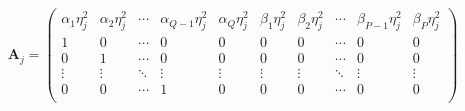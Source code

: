 \documentclass[10pt,a4paper,oneside]{article}
\providecommand{\DIFaddbegin}{} %
\providecommand{\DIFdelbegin}{} %
\providecommand{\DIFdelend}{} %
\newcommand{\DIFscaledelfig}{0.5}
\newlength{\DIFdelgraphicswidth} %
\newlength{\DIFdelgraphicsheight} %
\newcommand{\DIFaddincludegraphics}[2][]{{\color{blue}\fbox{\DIFOincludegraphics[#1]{#2}}}} %
\newcommand{\DIFdelincludegraphics}[2][]{%
\sbox{\DIFdelgraphicsbox}{\DIFOincludegraphics[#1]{#2}}%
\settoboxwidth{\DIFdelgraphicswidth}{\DIFdelgraphicsbox} %
\settoboxtotalheight{\DIFdelgraphicsheight}{\DIFdelgraphicsbox} %
\scalebox{\DIFscaledelfig}{%
\parbox[b]{\DIFdelgraphicswidth}{\usebox{\DIFdelgraphicsbox}\\[-\baselineskip] \rule{\DIFdelgraphicswidth}{0em}}\llap{\resizebox{\DIFdelgraphicswidth}{\DIFdelgraphicsheight}{%
\setlength{\unitlength}{\DIFdelgraphicswidth}%
\begin{picture}(1,1)%
\thicklines\linethickness{2pt} %
{\color[rgb]{1,0,0}\put(0,0){\framebox(1,1){}}}%
{\color[rgb]{1,0,0}\put(0,0){\line( 1,1){1}}}%
{\color[rgb]{1,0,0}\put(0,1){\line(1,-1){1}}}%
\end{picture}%
}\hspace*{3pt}}} %
} %
\DeclareRobustCommand{\DIFaddbegin}{\DIFOaddbegin \let\includegraphics\DIFaddincludegraphics} %
\DeclareRobustCommand{\DIFdelbegin}{\DIFOdelbegin \let\includegraphics\DIFdelincludegraphics} %
\DeclareRobustCommand{\DIFdelend}{\DIFOaddend \let\includegraphics\DIFOincludegraphics} %
\begin{document}
\[
    \mathbf{A}_j =
    \DIFdelbegin %
\DIFdelend \DIFaddbegin \begin{pmatrix}
        \alpha_1 \eta_j^2 & \alpha_2 \eta_j^2 & \cdots & \alpha_{Q - 1} \eta_j^2 & \alpha_Q \eta_j^2 & \beta_1 \eta_j^2 & \beta_2 \eta_j^2 & \cdots & \beta_{P - 1} \eta_j^2 & \beta_P \eta_j^2 \\
        1                 & 0                 & \cdots & 0                       & 0                 & 0                & 0                & \cdots & 0                      & 0                \\
        0                 & 1                 & \cdots & 0                       & 0                 & 0                & 0                & \cdots & 0                      & 0                \\
        \vdots            & \vdots            & \ddots & \vdots                  & \vdots            & \vdots           & \vdots           & \ddots & \vdots                 & \vdots           \\
        0                 & 0                 & \cdots & 1                       & 0                 & 0                & 0                & \cdots & 0                      & 0                \\

\end{pmatrix}\]
\end{document}

